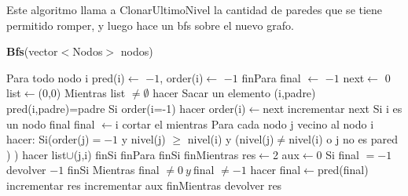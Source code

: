 \documentclass[spanish,12pt]{article}
\begin{document}
Este algoritmo llama a ClonarUltimoNivel la cantidad de paredes que se tiene permitido romper, y luego hace un bfs sobre el nuevo grafo.


\begin{algorithm}[H]{\textbf{Bfs}(vector$<$Nodos$>$ nodos)}
	\begin{algorithmic}[1]
		\State \quad Para todo nodo i
			\State \quad \quad  pred(i)$\gets$ $-1$, order(i)$\gets$ $-1$
		\State \quad finPara
		\State \quad final $\gets$ $-1$
		\State \quad next$\gets$ 0
		\State \quad list$\gets${(0,0)}
		\State \quad Mientras list $\neq \emptyset$ hacer
			\State \quad \quad Sacar un elemento (i,padre)
			\State \quad \quad pred(i,padre)=padre
			\State \quad \quad Si order(i=-1) hacer
				\State \quad \quad \quad order(i)$\gets$next
				\State \quad \quad \quad incrementar next
				\State \quad \quad \quad Si i es un nodo final
					\State \quad \quad \quad \quad final $\gets$i
					\State \quad \quad \quad \quad cortar el mientras
				\State \quad \quad \quad Para cada nodo j vecino al nodo i hacer:
					\State \quad \quad \quad \quad Si(order(j)$=-1$ y nivel(j) $\geq$ nivel(i) y (nivel(j)$\neq$nivel(i) o j no es pared )  ) hacer
						 \State \quad \quad \quad \quad \quad list$\cup${(j,i)}
					\State \quad \quad \quad \quad finSi
				\State \quad \quad \quad   finPara
			\State \quad \quad  finSi
		\State \quad finMientras
		\State \quad res$\gets$2
		\State \quad aux$\gets$0
		\State \quad Si final $= -1$
		\State \quad \quad devolver $-1$
		\State \quad finSi		
		\State \quad Mientras  final $\neq 0 \ y \ $final $\neq -1 $ hacer
			\State \quad \quad  final$\gets$pred(final)
			\State \quad \quad incrementar res
			\State \quad \quad incrementar aux
		\State \quad finMientras
		\State \quad devolver res
		
	\end{algorithmic}
\end{algorithm}
\end{document}
